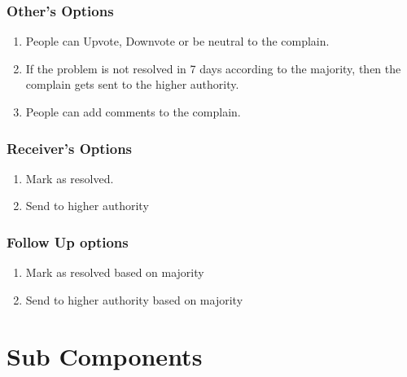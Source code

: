 \documentclass{article}
\begin{document}
			\subsubsection{Other's Options}
				\begin{enumerate}
					\item People can Upvote, Downvote or be neutral to the complain.
					\item If the problem is not resolved in 7 days according to the majority, then the complain gets sent to the higher authority.
					\item People can add comments to the complain.
				\end{enumerate}
			\subsubsection{Receiver's Options}
				\begin{enumerate}
					\item Mark as resolved.
					\item Send to higher authority
				\end{enumerate}
			\subsubsection{Follow Up options}
				\begin{enumerate}
					\item Mark as resolved based on majority
					\item Send to higher authority based on majority
				\end{enumerate}
	\section{Sub Components}
\end{document}

